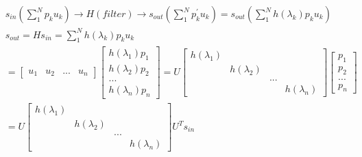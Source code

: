 \documentclass{article}
\begin{document}
%
\begin{align*}
    & s_{in} 
      \left ( \sum_{1}^{N} p_{k} u_{k} \right ) 
      \to H(filter) \to 
      s_{out} 
      \left ( \sum_{1}^{N} p_{k}^{'} u_{k} \right ) = 
      s_{out} 
      \left ( \sum_{1}^{N} h(\lambda_{k}) p_{k} u_{k} \right )  \\[3pt]
    & s_{out} = H s_{in} = \sum_{1}^{N} h(\lambda_{k}) p_{k} u_{k}  \\[3pt]
    & = \begin{bmatrix}
            u_{1} & u_{2} & ... & u_{n}
        \end{bmatrix}
        \begin{bmatrix}
            h(\lambda_{1}) p_{1} \\
            h(\lambda_{2}) p_{2} \\
            ... \\
            h(\lambda_{n}) p_{n}
        \end{bmatrix}
      = U 
        \begin{bmatrix}
            h(\lambda_{1})  &  &  &  \\
            &  h(\lambda_{2})  &  &  \\
            &  &  ...  &  \\
            &  &  &  h(\lambda_{n})
        \end{bmatrix}
        \begin{bmatrix}
            p_{1} \\
            p_{2} \\
            ... \\
            p_{n}
        \end{bmatrix}  \\[3pt]
    & = U 
        \begin{bmatrix}
            h(\lambda_{1})  &  &  &  \\
            &  h(\lambda_{2})  &  &  \\
            &  &  ...  &  \\
            &  &  &  h(\lambda_{n})
        \end{bmatrix}
        U^{T} s_{in}  \\[3pt]
\end{align*}
\end{document}
